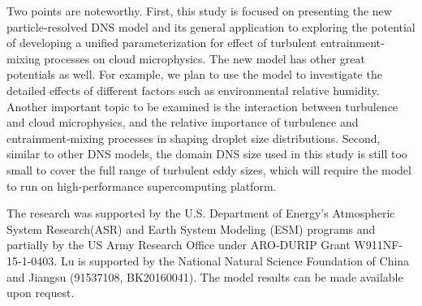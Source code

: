 \documentclass[draft,linenumbers]{agujournal}
\begin{document}
Two points are noteworthy. First, this study is focused on presenting the new particle-resolved DNS model and its general application to exploring the potential of developing a unified parameterization for effect of turbulent entrainment-mixing processes on cloud microphysics. The new model has other great potentials as well. For example, we plan to use the model to investigate the detailed effects of different factors such as environmental relative humidity. Another important topic to be examined is the interaction between turbulence and cloud microphysics, and the relative importance of turbulence and entrainment-mixing processes in shaping droplet size distributions. Second, similar to other DNS models, the domain DNS size used in this study is still too small to cover the full range of turbulent eddy sizes, which will require the model to run on high-performance supercomputing platform.  

\acknowledgments
The research was supported by the U.S. Department of Energy's Atmospheric System Research(ASR) and Earth System Modeling (ESM) programs and partially by the US Army Research Office under ARO-DURIP Grant W911NF-15-1-0403. Lu is supported by the National Natural Science Foundation of China and Jiangsu (91537108, BK20160041). The model results can be made available upon request.
\end{document}
